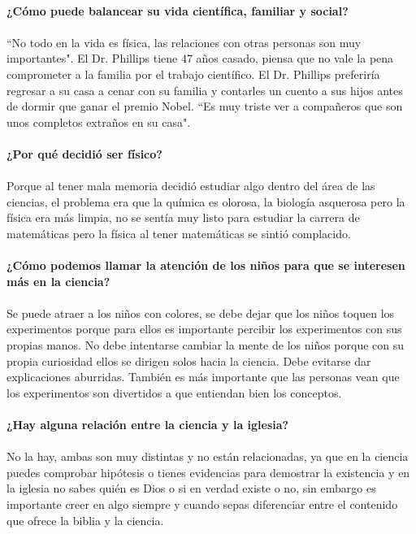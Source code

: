 \documentclass[10pt,letterpaper]{article}
\begin{document}
\\
\textbf{¿Cómo puede balancear su vida científica, familiar y social?}
\\
\\
``No todo en la vida es física, las relaciones con otras personas son muy importantes". El Dr. Phillips tiene 47 años casado, piensa que no vale la pena comprometer a la familia por el trabajo científico. El Dr. Phillips preferiría regresar a su casa a cenar con su familia y contarles un cuento a sus hijos antes de dormir que ganar el premio Nobel. ``Es muy triste ver a compañeros que son unos completos extraños en su casa".
\\
\\
\textbf{¿Por qué decidió ser físico?}
\\
\\
Porque al tener mala memoria decidió estudiar algo dentro del área de las ciencias, el problema era que la química es olorosa, la biología asquerosa pero la física era más limpia, no se sentía muy listo para estudiar la carrera de matemáticas pero la física al tener matemáticas se sintió complacido.
\\
\\
\textbf{¿Cómo podemos llamar la atención de los niños para que se interesen más en la ciencia?}
\\
\\
Se puede atraer a los niños con colores, se debe dejar que los niños toquen los experimentos porque para ellos es importante percibir los experimentos con sus propias manos. No debe intentarse cambiar la mente de los niños porque con su propia curiosidad ellos se dirigen solos hacia la ciencia. Debe evitarse dar explicaciones aburridas. También es más importante que las personas vean que los experimentos son divertidos a que entiendan bien los conceptos.
\\
\\
\textbf{¿Hay alguna relación entre la ciencia y la iglesia?}
\\
\\
No la hay, ambas son muy distintas y no están relacionadas, ya que en la ciencia puedes comprobar hipótesis o tienes evidencias para demostrar la existencia y en la iglesia no sabes quién es Dios o si en verdad existe o no, sin embargo es importante creer en algo siempre y cuando sepas diferenciar entre el contenido que ofrece la biblia y la ciencia.
\\
\\
\end{document}
